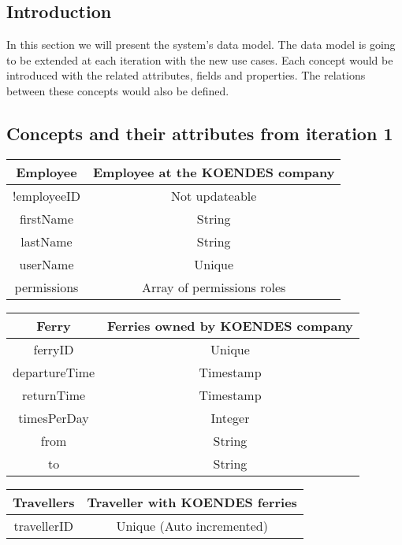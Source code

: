 
\subsection{Introduction}
In this section we will present the system's data model. The data model is going to be extended at each iteration with the new use cases. Each concept would be introduced with the related attributes, fields and properties. The relations between these concepts would also be defined.
\subsection{Concepts and their attributes from iteration 1}
\begin{table}[H]
\begin{tabular}{|c|c}
\cline{1-1}
Employee & Employee at the KOENDES company \\ \hline
!employeeID & Not updateable \\ firstName & String \\ lastName & String \\ userName & Unique \\ permissions & Array of permissions roles\\\hline
\end{tabular}
\end{table}

\begin{table}[H]
\begin{tabular}{|c|c}
\cline{1-1}
Ferry & Ferries owned by KOENDES company \\ \hline
ferryID & Unique \\ departureTime & Timestamp \\ returnTime & Timestamp \\ timesPerDay & Integer \\ from & String \\ to & String \\\hline
\end{tabular}
\end{table}

\begin{table}[H]
\begin{tabular}{|c|c}
\cline{1-1}
Travellers & Traveller with KOENDES ferries \\ \hline
travellerID & Unique (Auto incremented) \\ \hline
\end{tabular}
\end{table}

